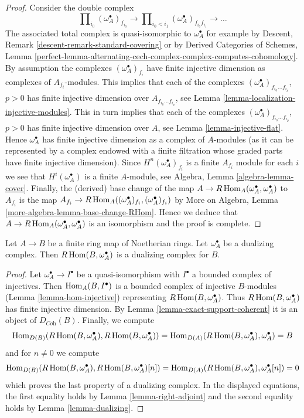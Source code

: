\begin{proof}
Consider the double complex
$$
\prod\nolimits_{i_0} (\omega_A^\bullet)_{f_{i_0}}
\to
\prod\nolimits_{i_0 < i_1} (\omega_A^\bullet)_{f_{i_0}f_{i_1}}
\to \ldots
$$
The associated total complex is quasi-isomorphic to $\omega_A^\bullet$
for example by Descent, Remark \ref{descent-remark-standard-covering}
or by
Derived Categories of Schemes, Lemma
\ref{perfect-lemma-alternating-cech-complex-complex-computes-cohomology}.
By assumption the complexes $(\omega_A^\bullet)_{f_i}$ have
finite injective dimension as complexes of $A_{f_i}$-modules.
This implies that each of the complexes
$(\omega_A^\bullet)_{f_{i_0} \ldots f_{i_p}}$, $p > 0$ has
finite injective dimension over $A_{f_{i_0} \ldots f_{i_p}}$,
see Lemma \ref{lemma-localization-injective-modules}.
This in turn implies that each of the complexes
$(\omega_A^\bullet)_{f_{i_0} \ldots f_{i_p}}$, $p > 0$ has
finite injective dimension over $A$, see
Lemma \ref{lemma-injective-flat}. Hence $\omega_A^\bullet$
has finite injective dimension as a complex of $A$-modules
(as it can be represented by a complex endowed with
a finite filtration whose graded parts have finite injective
dimension). Since $H^n(\omega_A^\bullet)_{f_i}$ is a finite
$A_{f_i}$ module for each $i$ we see that $H^i(\omega_A^\bullet)$
is a finite $A$-module, see Algebra, Lemma \ref{algebra-lemma-cover}.
Finally, the (derived) base change of the map
$A \to R\mathop{\mathrm{Hom}}\nolimits_A(\omega_A^\bullet, \omega_A^\bullet)$ to $A_{f_i}$
is the map
$A_{f_i} \to R\mathop{\mathrm{Hom}}\nolimits_A((\omega_A^\bullet)_{f_i}, (\omega_A^\bullet)_{f_i})$ by
More on Algebra, Lemma \ref{more-algebra-lemma-base-change-RHom}.
Hence we deduce that
$A \to R\mathop{\mathrm{Hom}}\nolimits_A(\omega_A^\bullet, \omega_A^\bullet)$
is an isomorphism and the proof is complete.
\end{proof}

\begin{lemma}
\label{lemma-dualizing-finite}
Let $A \to B$ be a finite ring map of Noetherian rings.
Let $\omega_A^\bullet$ be a dualizing complex.
Then $R\mathop{\mathrm{Hom}}\nolimits(B, \omega_A^\bullet)$ is a dualizing complex for $B$.
\end{lemma}

\begin{proof}
Let $\omega_A^\bullet \to I^\bullet$ be a quasi-isomorphism
with $I^\bullet$ a bounded complex of injectives.
Then $\mathop{\mathrm{Hom}}\nolimits_A(B, I^\bullet)$ is a bounded complex of injective
$B$-modules (Lemma \ref{lemma-hom-injective}) representing
$R\mathop{\mathrm{Hom}}\nolimits(B, \omega_A^\bullet)$.
Thus $R\mathop{\mathrm{Hom}}\nolimits(B, \omega_A^\bullet)$ has finite injective dimension.
By Lemma \ref{lemma-exact-support-coherent} it is an object of
$D_{\textit{Coh}}(B)$. Finally, we compute
$$
\mathop{\mathrm{Hom}}\nolimits_{D(B)}(R\mathop{\mathrm{Hom}}\nolimits(B, \omega_A^\bullet), R\mathop{\mathrm{Hom}}\nolimits(B, \omega_A^\bullet)) =
\mathop{\mathrm{Hom}}\nolimits_{D(A)}(R\mathop{\mathrm{Hom}}\nolimits(B, \omega_A^\bullet), \omega_A^\bullet) = B
$$
and for $n \not = 0$ we compute
$$
\mathop{\mathrm{Hom}}\nolimits_{D(B)}(R\mathop{\mathrm{Hom}}\nolimits(B, \omega_A^\bullet), R\mathop{\mathrm{Hom}}\nolimits(B, \omega_A^\bullet)[n]) =
\mathop{\mathrm{Hom}}\nolimits_{D(A)}(R\mathop{\mathrm{Hom}}\nolimits(B, \omega_A^\bullet), \omega_A^\bullet[n]) = 0
$$
which proves the last property of a dualizing complex.
In the displayed equations, the first
equality holds by Lemma \ref{lemma-right-adjoint}
and the second equality holds by Lemma \ref{lemma-dualizing}.
\end{proof}

